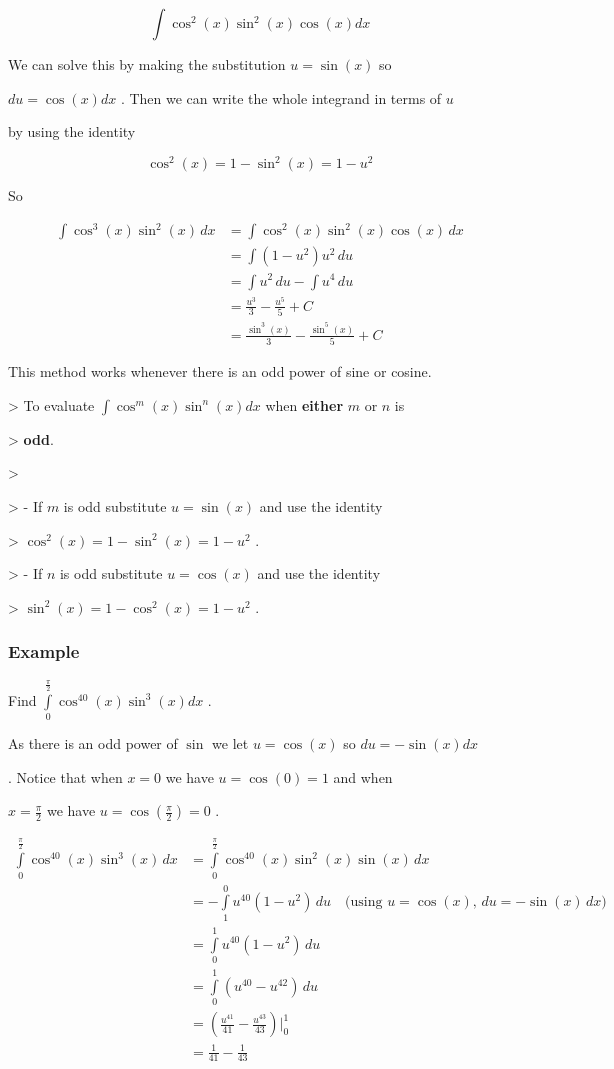 \[
\int\cos^2(x)\sin^2(x)\cos(x)dx
\]


We can solve this by making the substitution $u=\sin(x)$ so

$du=\cos(x)dx$ . Then we can write the whole integrand in terms of $u$

by using the identity


\[
\cos^2(x)=1-\sin^2(x)=1-u^2
\]


So


\begin{align}
\int\cos^3(x)\sin^2(x)\,dx &= \int\cos^2(x)\sin^2(x)\cos(x)\,dx \\&= \int (1 - u^2)u^2\,du \\&= \int u^2\,du - \int u^4\,du \\&= \frac{u^3}{3} - \frac{u^5}{5} + C \\&= \frac{\sin^3(x)}{3} - \frac{\sin^5(x)}{5} + C
\end{align}


This method works whenever there is an odd power of sine or cosine.


> To evaluate $\int\cos^m(x)\sin^n(x)dx$ when \textbf{either} $m$ or $n$ is

> \textbf{odd}.

>

> -   If $m$ is odd substitute $u=\sin(x)$ and use the identity

>     $\cos^2(x)=1-\sin^2(x)=1-u^2$ .

> -   If $n$ is odd substitute $u=\cos(x)$ and use the identity

>     $\sin^2(x)=1-\cos^2(x)=1-u^2$ .


\subsubsection{Example}
\label{sss:exam-1a79}


Find $\int\limits_0^\frac{\pi}{2} \cos^{40}(x)\sin^3(x)dx$ .


As there is an odd power of $\sin$ we let $u=\cos(x)$ so $du=-\sin(x)dx$

. Notice that when $x=0$ we have $u=\cos(0)=1$ and when

$x=\frac{\pi}{2}$ we have $u=\cos(\tfrac{\pi}{2})=0$ .


\begin{align} \int\limits_0^\frac{\pi}{2} \cos^{40}(x)\sin^3(x)\,dx  &= \int\limits_0^\frac{\pi}{2} \cos^{40}(x)\sin^2(x)\sin(x)\,dx \\ &= -\int\limits_1^0 u^{40}(1-u^2)\,du \quad \text{(using $u = \cos(x)$, $du = -\sin(x)\,dx$)} \\ &= \int\limits_0^1 u^{40}(1-u^2)\,du \\ &= \int\limits_0^1 \left(u^{40} - u^{42}\right)\,du \\ &= \left(\frac{u^{41}}{41} - \frac{u^{43}}{43}\right)\Bigg| _0^1 \\ &= \frac{1}{41} - \frac{1}{43} \end{align}


